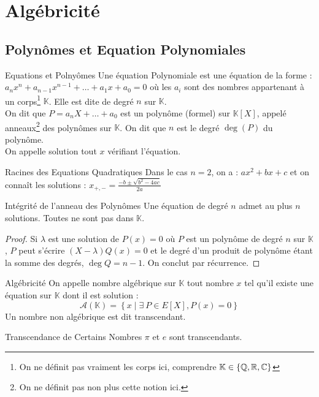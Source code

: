 \documentclass{cours}
\renewcommand*{\K}{\mathbb{K}}
\begin{document}
    \section{Algébricité}
    \subsection{Polynômes et Equation Polynomiales}
    \begin{définition}{Equations et Polnyômes}{}
        Une équation Polynomiale est une équation de la forme : $a_{n}x^{n} + a_{n-1}x^{n-1} + \ldots + a_{1}x + a_{0} = 0$ où les $a_{i}$ sont des nombres appartenant à un corps\footnote{On ne définit pas vraiment les corps ici, comprendre $\K \in \left\{\Q, \R, \C\right\}$} $\K$. Elle est dite de degré $n$ sur $\K$. \\ 
        On dit que $P = a_{n}X + \ldots + a_{0}$ est un polynôme (formel) sur $\K\left[X\right]$, appelé anneaux\footnote{On ne définit pas non plus cette notion ici.} des polynômes sur $\K$. On dit que $n$ est le degré $\deg(P)$ du polynôme.\\
        On appelle solution tout $x$ vérifiant l'équation.
    \end{définition}   
    
    \begin{propositionfr}{Racines des Equations Quadratiques}{}
        Dans le cas $n = 2$, on a : $ax^{2} + bx + c$ et on connaît les solutions : $x_{+, -} = \frac{-b \pm \sqrt{b^{2} - 4ac}}{2a}$
    \end{propositionfr}

    \begin{théorème}{Intégrité de l'anneau des Polynômes}{}
        Une équation de degré $n$ admet au plus $n$ solutions. Toutes ne sont pas dans $\K$.
    \end{théorème}
    \begin{proof}
        Si $\lambda$ est une solution de $P(x) = 0$ où $P$ est un polynôme de degré $n$ sur $\K$, $P$ peut s'écrire $(X - \lambda)Q(x) = 0$ et le degré d'un produit de polynôme étant la somme des degrés, $\deg Q = n - 1$. On conclut par récurrence.
    \end{proof}

    \begin{définition}{Algébricité}{}
        On appelle nombre algébrique sur $\K$ tout nombre $x$ tel qu'il existe une équation sur $\K$ dont il est solution : 
        \[
            \mathcal{A}(\K) = \left\{x \mid \exists \ P \in E[X], P(x) = 0\right\}    
        \]
        Un nombre non algébrique est dit transcendant.
    \end{définition}
    \begin{propositionfr}{Transcendance de Certains Nombres}{}
        $\pi$ et $e$ sont transcendants.
    \end{propositionfr}
\end{document}
